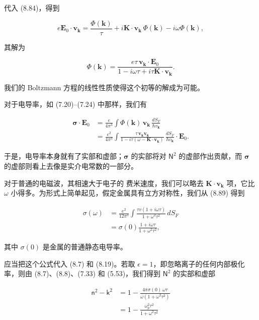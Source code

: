 代入 (8.84)，得到

\begin{equation*}
e\mathbf{E}_0\cdot\mathbf{v}_{\mathbf{k}} = \frac{\Phi(\mathbf{k})}{\tau} + i\mathbf{K}\cdot\mathbf{v}_{\mathbf{k}}\,\Phi(\mathbf{k}) - i\omega\Phi(\mathbf{k}),
\tag{8.87}
\end{equation*}

其解为

\begin{equation*}
\Phi(\mathbf{k}) = \frac{e\tau\,\mathbf{v}_{\mathbf{k}}\cdot\mathbf{E}_0}{1-i\omega\tau+i\tau\mathbf{K}\cdot\mathbf{v}_{\mathbf{k}}}.
\tag{8.88}
\end{equation*}

我们的 Boltzmann 方程的线性性质使得这个初等的解成为可能。

对于电导率，如 (7.20)--(7.24) 中那样，我们有

\begin{align*}
\boldsymbol{\sigma}\cdot\mathbf{E}_0 &= \frac{e}{4\pi^3}\int \Phi(\mathbf{k})\,\mathbf{v}_{\mathbf{k}}\,\frac{dS_F}{\hbar v_{\mathbf{k}}} \\
&= \frac{e^2}{4\pi^3}\int \frac{\tau\,\mathbf{v}_{\mathbf{k}}\mathbf{v}_{\mathbf{k}}}{1-i\tau(\omega-\mathbf{K}\cdot\mathbf{v}_{\mathbf{k}})}\,\frac{dS_F}{\hbar v_{\mathbf{k}}}\cdot\mathbf{E}_0.
\tag{8.89}
\end{align*}

于是，电导率本身就有了实部和虚部；$\boldsymbol{\sigma}$ 的实部将对 $\mathsf{N}^2$ 的虚部作出贡献，而 $\boldsymbol{\sigma}$ 的虚部则看上去像是实介电常数的一部分。

对于普通的电磁波，其相速大于电子的 费米速度，我们可以略去 $\mathbf{K}\cdot\mathbf{v}_{\mathbf{k}}$ 项，它比 $\omega$ 小得多。为形式上简单起见，假定金属具有立方对称性，我们从 (8.89) 得到

\begin{align*}
\sigma(\omega) &= \frac{e^2}{12\pi^3}\int \frac{\tau v(1+i\omega\tau)}{1+\omega^2\tau^2}\,dS_F \\
&= \sigma(0)\frac{1+i\omega\tau}{1+\omega^2\tau^2},
\tag{8.90}
\end{align*}

其中 $\sigma(0)$ 是金属的普通静态电导率。

应当把这个公式代入 (8.7) 和 (8.19)。若取 $\epsilon=1$，即忽略离子的任何内部极化率，则由 (8.7)、(8.8)、(7.33) 和 (5.53)，我们得到 $\mathsf{N}^2$ 的实部和虚部

\begin{align*}
\mathsf{n}^2-\mathsf{k}^2 &= 1-\frac{4\pi\sigma(0)\,\omega\tau}{\omega(1+\omega^2\tau^2)} \\
&= 1-\frac{\omega_p^2\tau^2}{1+\omega^2\tau^2}
\tag{8.91}
\end{align*}

